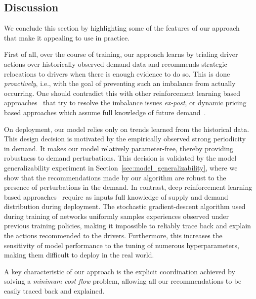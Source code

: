 \subsection{Discussion}

We conclude this section by highlighting some of the features of our approach 
    that make it appealing to use in practice. 

First of all, over the course of training, our approach learns by trialing driver
    actions over historically observed demand data and recommends 
    strategic relocations to drivers when there is enough evidence to do so.
This is done \emph{proactively}, i.e., with the goal of preventing such an
    imbalance from actually occurring. 
One should contradict this with other reinforcement
    learning based approaches~\cite{Lin2018-vs, Li2019-bp} that try to resolve the
    imbalance issues \emph{ex-post}, 
    or dynamic pricing based approaches which assume full knowledge of future
    demand~\cite{Ma2018-hb}.

On deployment, our model relies only on trends learned from the 
    historical data.
This design decision is motivated by the empirically observed strong periodicity in demand.
It makes our model relatively parameter-free, thereby providing robustness to
    demand perturbations.
This decision is validated by the model generalizability experiment in
    Section~\ref{sec:model_generalizability}, where we show that the recommendations
    made by our algorithm are robust to the presence of perturbations in the demand.
In contrast, deep reinforcement learning based approaches~\cite{Mnih2013-sj,Tang2019-xu,Lin2018-vs, Wen2017-vp, 
    Wang2018-bv} require as inputs full knowledge of supply and demand 
    distribution during deployment. 
The stochastic
    gradient-descent algorithm used during training of networks uniformly
    samples experiences observed under previous training policies, making it
    impossible to reliably trace back and explain the actions recommended
    to the drivers.
Furthermore, this increases the sensitivity of model 
    performance to the tuning of numerous hyperparameters, making them 
    difficult to deploy in the real world.

A key characteristic of our approach is the explicit coordination achieved
    by solving a \emph{minimum cost flow} problem, allowing all our
    recommendations to be easily traced back and explained.
\fi
